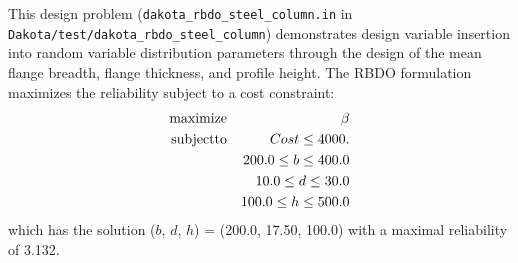 This design problem (\texttt{dakota\_rbdo\_steel\_column.in} in
\texttt{Dakota/test/dakota\_rbdo\_steel\_column}) demonstrates design variable insertion into
random variable distribution parameters through the design of the mean
flange breadth, flange thickness, and profile height. The RBDO
formulation maximizes the reliability subject to a cost constraint:
\begin{eqnarray}
{\rm maximize }   & & \beta                   \nonumber \\
{\rm subject to } & & Cost  \leq 4000.       \nonumber \\
                  & & 200.0 \leq b \leq 400.0 \\
                  & &  10.0 \leq d \leq  30.0 \nonumber \\
                  & & 100.0 \leq h \leq 500.0 \nonumber
\end{eqnarray}
which has the solution ($b$, $d$, $h$) = (200.0, 17.50, 100.0) with a
maximal reliability of 3.132.

